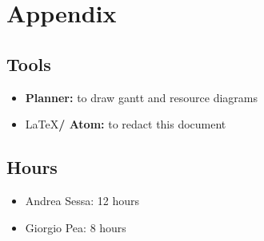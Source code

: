 \documentclass[11pt,titlepage]{article} %
\begin{document}
\newpage

\section{Appendix}
  	\subsection{Tools}
		\begin{itemize}
			\item \textbf{Planner:} to draw gantt and resource diagrams
			\item \LaTeX \textbf{/ Atom:} to redact this document
		\end{itemize}

	\subsection{Hours}
		\begin{itemize}
			\item Andrea Sessa: 12 hours
			\item Giorgio Pea: 8 hours
		\end{itemize}
\end{document}
